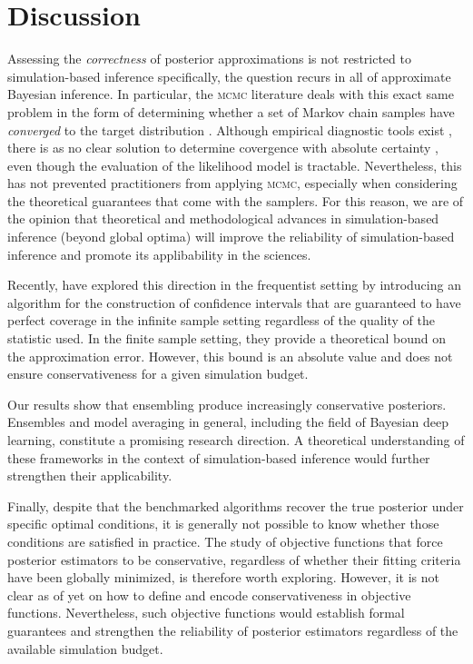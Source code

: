 \documentclass[twoside]{article}
\begin{document}
\section{Discussion}
\label{sec:discussion}
Assessing the \emph{correctness} of posterior approximations is not restricted to simulation-based inference specifically, the question recurs in all of approximate Bayesian inference.
In particular, the \textsc{mcmc} literature deals with this exact same problem in the form of determining whether a set of Markov chain samples have \emph{converged} to the target distribution \citep{lin2014integrated,hogg2018data}.
Although empirical diagnostic tools exist \citep{geweke1991evaluating,gelman1992inference,raftery1991many,dixit2017mcmc},
there is as no clear solution to determine covergence with absolute certainty \citep{dixit2018developments,roy2020convergence}, even though the evaluation of the likelihood model is tractable.
Nevertheless, this has not prevented practitioners from applying \textsc{mcmc}, especially when considering the theoretical guarantees that come with the samplers. For this reason, we are of the opinion that theoretical and methodological advances in simulation-based inference (beyond global optima) will improve the reliability of simulation-based inference and promote its applibability in the sciences.

Recently, \citet{dalmasso2021likelihood} have explored this direction in the frequentist setting by introducing an algorithm for the construction of confidence intervals that are guaranteed to have perfect coverage in the infinite sample setting regardless of the quality of the statistic used. In the finite sample setting, they provide a theoretical bound on the approximation error.
However, this bound is an absolute value and does not ensure conservativeness for a given simulation budget.

Our results show that ensembling produce increasingly conservative posteriors. Ensembles and model averaging in general, including the field of Bayesian deep learning, constitute a promising research direction. A theoretical understanding of these frameworks in the context of simulation-based inference would further strengthen their applicability.

Finally, despite that the benchmarked algorithms recover the true posterior under specific optimal conditions, it is generally not possible to know whether those conditions are satisfied in practice.
The study of objective functions that force posterior estimators to be conservative, regardless of whether their fitting criteria have been globally minimized, is therefore worth exploring. However, it is not clear as of yet on how to define and encode conservativeness in objective functions. Nevertheless, such objective functions would establish formal guarantees and strengthen the reliability of posterior estimators regardless of the available simulation budget.
\end{document}
